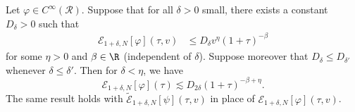 \documentclass[10pt, reqno]{amsart}
\begin{document}
\begin{lemma}
Let \(\varphi{}\in C^\infty(\mathcal{R})\). Suppose that for all \(\delta{} > 0\) small, there exists
a constant \(D_\delta{} > 0\) such that
\begin{align}
\mathcal{E}_{1+\delta{},N}[\varphi{}](\tau{},v)&\le  D_\delta{}v^{\eta{}}(1+\tau{})^{-\beta{}}
\end{align}
for some \(\eta{} > 0\) and \(\beta{}\in \R\) (independent of \(\delta{}\)). Suppose moreover that
\(D_\delta{} \le D_{\delta{}'}\) whenever \(\delta{}\le \delta{}'\). Then for \(\delta{} < \eta{}\), we have
\begin{equation}
\mathcal{E}_{1+\delta{},N}[\varphi{}](\tau{})\lesssim D_{2\delta{}}(1+\tau{})^{-\beta{}+\eta{}}.
\end{equation}
The same result holds with \(\tilde{\mathcal{E}}_{1 + \delta{},N}[\psi{}](\tau{},v)\) in place of \(\mathcal{E}_{1+\delta{},N}[\varphi{}](\tau{},v)\).
\label{energy-decay-upgrade}
\end{lemma}
\end{document}
